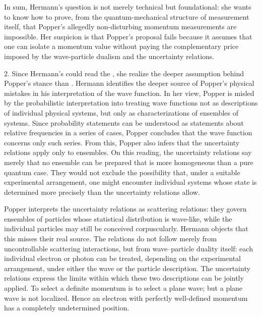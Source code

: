 In sum, Hermann’s question is not merely technical but foundational: she wants to know how to prove, from the quantum-mechanical structure of measurement itself, that Popper’s allegedly non-disturbing momentum measurements are impossible. Her suspicion is that Popper’s proposal fails because it assumes that one can isolate a momentum value without paying the complementary price imposed by the wave-particle dualism and the uncertainty relations.

2. Since Hermann's could read the \LdF, she realize the deeper assumption behind Popper's stance than \vW.  Hermann identifies the deeper source of Popper’s physical mistakes in his interpretation of the wave function. In her view, Popper is misled by the probabilistic interpretation into treating wave functions not as descriptions of individual physical systems, but only as characterizations of ensembles of systems. Since probability statements can be understood as statements about relative frequencies in a series of cases, Popper concludes that the wave function concerns only such series. From this, Popper also infers that the uncertainty relations apply only to ensembles. On this reading, the uncertainty relations say merely that no ensemble can be prepared that is more homogeneous than a pure quantum case. They would not exclude the possibility that, under a suitable experimental arrangement, one might encounter individual systems whose state is determined more precisely than the uncertainty relations allow.


Popper interprets the uncertainty relations as scattering relations: they govern ensembles of particles whose statistical distribution is wave-like, while the individual particles may still be conceived corpuscularly. Hermann objects that this misses their real source. The relations do not follow merely from uncontrollable scattering interactions, but from wave–particle duality itself: each individual electron or photon can be treated, depending on the experimental arrangement, under either the wave or the particle description. The uncertainty relations express the limits within which these two descriptions can be jointly applied. To select a definite momentum is to select a plane wave; but a plane wave is not localized. Hence an electron with perfectly well-defined momentum has a completely undetermined position. 




